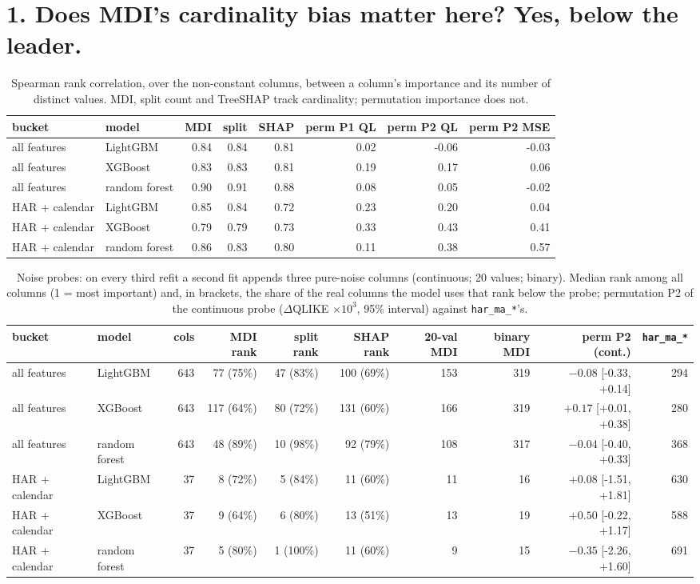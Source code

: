 \documentclass[10pt]{article}
\begin{document}
\section*{1. Does MDI's cardinality bias matter here? Yes, below the leader.}
\begin{table}[H]\centering\footnotesize
\caption{Spearman rank correlation, over the non-constant columns, between a column's importance and its number of distinct values. MDI, split count and TreeSHAP track cardinality; permutation importance does not.}
\begin{tabular}{llrrrrrr}\toprule
bucket & model & MDI & split & SHAP & perm P1 QL & perm P2 QL & perm P2 MSE\\\midrule
all features & LightGBM & 0.84 & 0.84 & 0.81 & 0.02 & -0.06 & -0.03 \\
all features & XGBoost & 0.83 & 0.83 & 0.81 & 0.19 & 0.17 & 0.06 \\
all features & random forest & 0.90 & 0.91 & 0.88 & 0.08 & 0.05 & -0.02 \\
HAR + calendar & LightGBM & 0.85 & 0.84 & 0.72 & 0.23 & 0.20 & 0.04 \\
HAR + calendar & XGBoost & 0.79 & 0.79 & 0.73 & 0.33 & 0.43 & 0.41 \\
HAR + calendar & random forest & 0.86 & 0.83 & 0.80 & 0.11 & 0.38 & 0.57 \\
\bottomrule\end{tabular}\end{table}
\begin{table}[H]\centering\scriptsize
\caption{Noise probes: on every third refit a second fit appends three pure-noise columns (continuous; 20 values; binary). Median rank among all columns (1 = most important) and, in brackets, the share of the real columns the model uses that rank below the probe; permutation P2 of the continuous probe ($\Delta$QLIKE $\times 10^{3}$, 95\% interval) against \texttt{har\_ma\_*}'s.}
\begin{tabular}{llrrrrrrrr}\toprule
bucket & model & cols & MDI rank & split rank & SHAP rank & 20-val MDI & binary MDI & perm P2 (cont.) & \texttt{har\_ma\_*}\\\midrule
all features & LightGBM & 643 & 77 (75\%) & 47 (83\%) & 100 (69\%) & 153 & 319 & $-0.08$ [-0.33, +0.14] & 294 \\
all features & XGBoost & 643 & 117 (64\%) & 80 (72\%) & 131 (60\%) & 166 & 319 & $+0.17$ [+0.01, +0.38] & 280 \\
all features & random forest & 643 & 48 (89\%) & 10 (98\%) & 92 (79\%) & 108 & 317 & $-0.04$ [-0.40, +0.33] & 368 \\
HAR + calendar & LightGBM & 37 & 8 (72\%) & 5 (84\%) & 11 (60\%) & 11 & 16 & $+0.08$ [-1.51, +1.81] & 630 \\
HAR + calendar & XGBoost & 37 & 9 (64\%) & 6 (80\%) & 13 (51\%) & 13 & 19 & $+0.50$ [-0.22, +1.17] & 588 \\
HAR + calendar & random forest & 37 & 5 (80\%) & 1 (100\%) & 11 (60\%) & 9 & 15 & $-0.35$ [-2.26, +1.60] & 691 \\
\bottomrule\end{tabular}\end{table}
\end{document}
